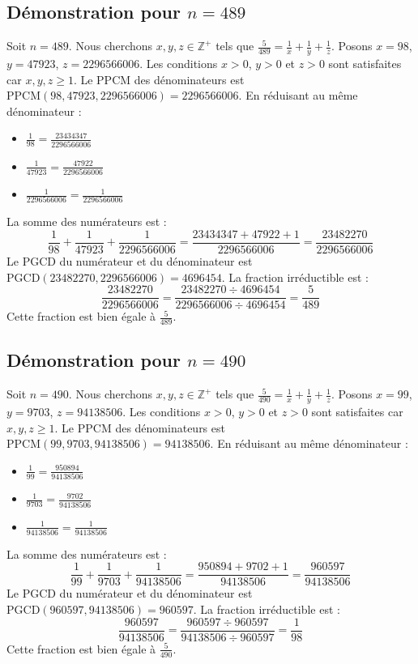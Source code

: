 \documentclass[11pt,a4paper]{article}
\begin{document}
\subsection{Démonstration pour $n = 489$}
Soit $n = 489$. Nous cherchons $x, y, z \in \mathbb{Z}^{+}$ tels que $\frac{5}{489} = \frac{1}{x} + \frac{1}{y} + \frac{1}{z}$.
Posons $x = 98$, $y = 47923$, $z = 2296566006$.
Les conditions $x > 0$, $y > 0$ et $z > 0$ sont satisfaites car $x, y, z \geq 1$.
Le PPCM des dénominateurs est $\text{PPCM}(98, 47923, 2296566006) = 2296566006$.
En réduisant au même dénominateur :
\begin{itemize}
    \item $\frac{1}{98} = \frac{23434347}{2296566006}$
    \item $\frac{1}{47923} = \frac{47922}{2296566006}$
    \item $\frac{1}{2296566006} = \frac{1}{2296566006}$
\end{itemize}
La somme des numérateurs est :
$$ \frac{1}{98} + \frac{1}{47923} + \frac{1}{2296566006} = \frac{23434347 + 47922 + 1}{2296566006} = \frac{23482270}{2296566006} $$
Le PGCD du numérateur et du dénominateur est $\text{PGCD}(23482270, 2296566006) = 4696454$.
La fraction irréductible est :
$$ \frac{23482270}{2296566006} = \frac{23482270 \div 4696454}{2296566006 \div 4696454} = \frac{5}{489} $$
Cette fraction est bien égale à $\frac{5}{489}$.

\subsection{Démonstration pour $n = 490$}
Soit $n = 490$. Nous cherchons $x, y, z \in \mathbb{Z}^{+}$ tels que $\frac{5}{490} = \frac{1}{x} + \frac{1}{y} + \frac{1}{z}$.
Posons $x = 99$, $y = 9703$, $z = 94138506$.
Les conditions $x > 0$, $y > 0$ et $z > 0$ sont satisfaites car $x, y, z \geq 1$.
Le PPCM des dénominateurs est $\text{PPCM}(99, 9703, 94138506) = 94138506$.
En réduisant au même dénominateur :
\begin{itemize}
    \item $\frac{1}{99} = \frac{950894}{94138506}$
    \item $\frac{1}{9703} = \frac{9702}{94138506}$
    \item $\frac{1}{94138506} = \frac{1}{94138506}$
\end{itemize}
La somme des numérateurs est :
$$ \frac{1}{99} + \frac{1}{9703} + \frac{1}{94138506} = \frac{950894 + 9702 + 1}{94138506} = \frac{960597}{94138506} $$
Le PGCD du numérateur et du dénominateur est $\text{PGCD}(960597, 94138506) = 960597$.
La fraction irréductible est :
$$ \frac{960597}{94138506} = \frac{960597 \div 960597}{94138506 \div 960597} = \frac{1}{98} $$
Cette fraction est bien égale à $\frac{5}{490}$.
\end{document}
